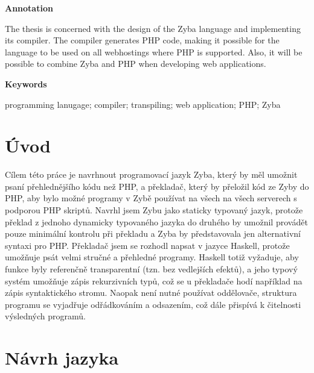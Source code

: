 \documentclass[a4paper,12pt]{article}
\begin{document}
\Large\textbf{Annotation}\normalsize

The thesis is concerned with the design of the Zyba language and implementing its compiler. The compiler generates PHP code, making it possible for the language to be used on all webhostings where PHP is supported. Also, it will be possible to combine Zyba and PHP when developing web applications.

\Large\textbf{Keywords}\normalsize

programming lanugage; compiler; transpiling; web application; PHP; Zyba
\newpage
\thispagestyle{empty}
\tableofcontents
\newpage
\section{Úvod}
Cílem této práce je navrhnout programovací jazyk Zyba, který by měl umožnit psaní přehlednějšího kódu než PHP, a překladač, který by přeložil kód ze Zyby do PHP, aby bylo možné programy v Zybě používat na všech na všech serverech s podporou PHP skriptů. Navrhl jsem Zybu jako staticky typovaný jazyk, protože překlad z jednoho dynamicky typovaného jazyka do druhého by umožnil provádět pouze minimální kontrolu při překladu a Zyba by představovala jen alternativní syntaxi pro PHP. Překladač jsem se rozhodl napsat v jazyce Haskell, protože umožňuje psát velmi stručné a přehledné programy. Haskell totiž vyžaduje, aby funkce byly referenčně transparentní (tzn. bez vedlejších efektů), a jeho typový systém umožňuje zápis rekurzivních typů, což se u překladače hodí například na zápis syntaktického stromu. Naopak není nutné používat oddělovače, struktura programu se vyjadřuje odřádkováním a odsazením, což dále přispívá k čitelnosti výsledných programů.

\section{Návrh jazyka}
\end{document}
